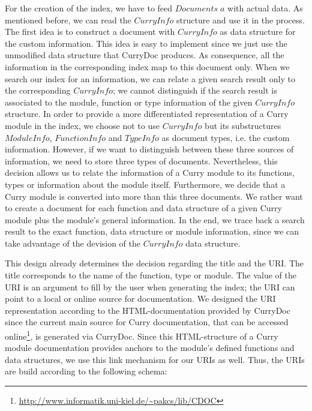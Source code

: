 \documentclass[%
	latex,%
	a4paper,%
	oneside,%
	chapterprefix,%
	headsepline,%
	12pt%
]{scrbook}
\newcommand{\Conid}[1]{\mathit{#1}}
\newcommand{\Varid}[1]{\mathit{#1}}
\begin{document}
For the creation of the index, we have to feed \ensuremath{\Conid{Documents}\;\Varid{a}} with
actual data. %
As mentioned before, we can read the \ensuremath{\Conid{CurryInfo}} structure and use it
in the process. %
The first idea is to construct a document with \ensuremath{\Conid{CurryInfo}} as data
structure for the custom information. %
This idea is easy to implement since we just use the unmodified data
structure that CurryDoc produces. %
As consequence, all the information in the corresponding index map to
this document only. %
When we search our index for an information, we can relate a given
search result only to the corresponding \ensuremath{\Conid{CurryInfo}}; we cannot
distinguish if the search result is associated to the module, function
or type information of the given \ensuremath{\Conid{CurryInfo}} structure. %
In order to provide a more differentiated representation of a Curry
module in the index, we choose not to use \ensuremath{\Conid{CurryInfo}} but its
substructures \ensuremath{\Conid{ModuleInfo}}, \ensuremath{\Conid{FunctionInfo}} and \ensuremath{\Conid{TypeInfo}} as document
types, i.e. the custom information. %
However, if we want to distinguish between these three sources of
information, we need to store three types of documents. %
Nevertheless, this decision allows us to relate the information of a
Curry module to its functions, types or information about the module
itself. %
Furthermore, we decide that a Curry module is converted into more than
this three documents. %
We rather want to create a document for each function and data
structure of a given Curry module plus the module's general
information. %
In the end, we trace back a search result to the exact function, data
structure or module information, since we can take advantage of the
devision of the \ensuremath{\Conid{CurryInfo}} data structure. %

This design already determines the decision regarding the title and
the URI. %
The title corresponds to the name of the function, type or module. %
The value of the URI is an argument to fill by the user when
generating the index; the URI can point to a local or online source
for documentation. %
We designed the URI representation according to the HTML-documentation provided
by CurryDoc since the current main source for Curry documentation,
that can be accessed
online\footnote{\url{http://www.informatik.uni-kiel.de/~pakcs/lib/CDOC}},
is generated via CurryDoc. %
Since this HTML-structure of a Curry module documentation provides
anchors to the module's defined functions and data structures, we use
this link mechanism for our URIs as well. %
Thus, the URIs are build according to the following schema:
\end{document}
